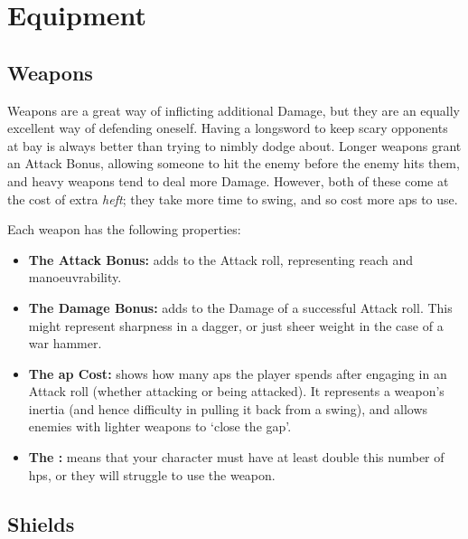 
\section{Equipment}

\begin{multicols}{2}

\subsection{Weapons}

\noindent
Weapons are a great way of inflicting additional Damage, but they are an equally excellent way of defending oneself.
Having a longsword to keep scary opponents at bay is always better than trying to nimbly dodge about.
Longer weapons grant an Attack Bonus, allowing someone to hit the enemy before the enemy hits them, and heavy weapons tend to deal more Damage.
However, both of these come at the cost of extra \emph{heft}; they take more time to swing, and so cost more \glspl{ap} to use.

Each weapon has the following properties:

\begin{itemize}

  \item
  \textbf{The Attack Bonus:} adds to the Attack roll, representing reach and manoeuvrability.
  \item
  \textbf{The Damage Bonus:} adds to the Damage of a successful Attack roll.
  This might represent sharpness in a dagger, or just sheer weight in the case of a war hammer.
  \item
  \textbf{The \Gls{ap} Cost:} shows how many \glspl{ap} the player spends after engaging in an Attack roll (whether attacking or being attacked).
  It represents a weapon's inertia (and hence difficulty in pulling it back from a swing), and allows enemies with lighter weapons to `close the gap'.
  \item
  \textbf{The :} means that your character must have at least double this number of \glspl{hp}, or they will struggle to use the weapon.
\end{itemize}

\weaponsChart
\label{weaponschart}

\subsection{Shields}


\end{multicols}
